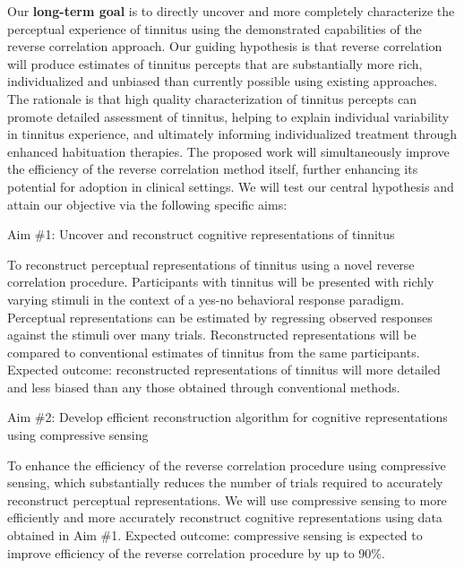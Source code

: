 \documentclass[11pt, notitlepage]{article} %
\begin{document}
Our \textbf{long-term goal} is to directly uncover and more completely characterize the perceptual experience of tinnitus using the demonstrated capabilities of the reverse correlation approach.
Our guiding hypothesis is that reverse correlation will produce estimates of tinnitus percepts that are substantially more rich, individualized and unbiased than currently possible using existing approaches. The rationale is that high quality characterization of tinnitus percepts can promote detailed assessment of tinnitus, helping to explain individual variability in tinnitus experience, and ultimately informing individualized treatment through enhanced habituation therapies. The proposed work will simultaneously improve the efficiency of the reverse correlation method itself, further enhancing its potential for adoption in clinical settings. We will test our central hypothesis and attain our objective via the following specific aims:

\begin{description}
	\item[Aim \#1: Uncover and reconstruct cognitive representations of tinnitus]{} 
\end{description}

To reconstruct perceptual representations of tinnitus using a novel reverse correlation procedure. Participants with tinnitus will be presented with richly varying stimuli in the context of a yes-no behavioral response paradigm. Perceptual representations can be estimated by regressing observed responses against the stimuli over many trials. Reconstructed representations will be compared to conventional estimates of tinnitus from the same participants. Expected outcome: reconstructed representations of tinnitus will more detailed and less biased than any those obtained through conventional methods.

\begin{description}
	\item[Aim \#2: Develop efficient reconstruction algorithm for cognitive representations using compressive sensing]{} 
\end{description}

To enhance the efficiency of the reverse correlation procedure using compressive sensing, which substantially reduces the number of trials required to accurately reconstruct perceptual representations. We will use compressive sensing to more efficiently and more accurately reconstruct cognitive representations using data obtained in Aim \#1. Expected outcome: compressive sensing is expected to improve efficiency of the reverse correlation procedure by up to 90\%.
\end{document}
